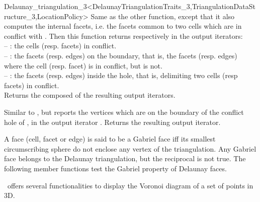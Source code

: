 \begin{ccRefClass}{Delaunay_triangulation_3<DelaunayTriangulationTraits_3,TriangulationDataStructure_3,LocationPolicy>}
{Same as the other  function, except that it also 
computes the internal facets, i.e. the facets common to two cells which
are in conflict with .
Then this function returns respectively in the output iterators:\\
-- : the cells (resp. facets) in conflict.\\
-- : the facets (resp. edges) on the boundary, that is, the facets
(resp. edges)  where the cell (resp. facet)  is in
conflict, but  is not.\\
-- : the facets (resp. edges) inside the hole, that is, delimiting
two cells (resp facets) in conflict.\\
Returns the  composed of the resulting output iterators.
}

{Similar to , but reports the vertices which are on the
boundary of the conflict hole of , in the output iterator .
Returns the resulting output iterator.
}

A face (cell, facet or edge) is said to be a Gabriel face iff
its   smallest circumscribing sphere do not enclose
any vertex of the triangulation.  Any Gabriel face belongs to the
Delaunay triangulation, but the reciprocal is not true.
The following member functions test the Gabriel property of
Delaunay faces.
\ccGlue 
{}
\ccGlue 
{}
\ccGlue
{} {}


\cgal\ offers several functionalities to display the Voronoi diagram of 
a set of points in 3D.


\end{ccRefClass}
